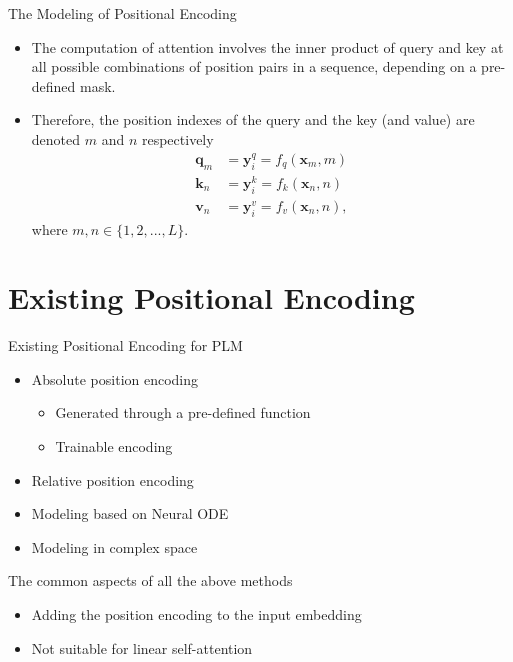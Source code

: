 \documentclass{beamer}
\begin{document}
	\begin{frame}{The Modeling of Positional Encoding}
		\begin{itemize}
			\item The computation of attention involves the inner product of query and key at all possible combinations of position pairs in a sequence, depending on a pre-defined mask.
			\item Therefore, the position indexes of the query and the key (and value) are denoted $m$ and $n$ respectively
			\begin{align}
				\mathbf{q}_m & = \mathbf{y}_i^q = f_q(\mathbf{x}_m, m) \label{eqn:proj_q_with_pos_enc}\\
				\mathbf{k}_n & = \mathbf{y}_i^k = f_k(\mathbf{x}_n, n) \label{eqn:proj_k_with_pos_enc}\\
				\mathbf{v}_n & = \mathbf{y}_i^v = f_v(\mathbf{x}_n, n), \label{eqn:proj_v_with_pos_enc}
			\end{align}
			where $m, n \in \{1,2,...,L\}$.			
		\end{itemize}
	\end{frame}
	
	\section{Existing Positional Encoding}
	\begin{frame}{Existing Positional Encoding for PLM}		
		\begin{itemize}
			\item Absolute position encoding
			\begin{itemize}
				\item Generated through a pre-defined function
				\item Trainable encoding
			\end{itemize}
			\item Relative position encoding
			\item Modeling based on Neural ODE
			\item Modeling in complex space
		\end{itemize}
		\begin{block}{The common aspects of all the above methods}
			\begin{itemize}				
				\item Adding the position encoding to the input embedding
				\item Not suitable for linear self-attention
			\end{itemize}
		\end{block}
	\end{frame}
	
\end{document}
